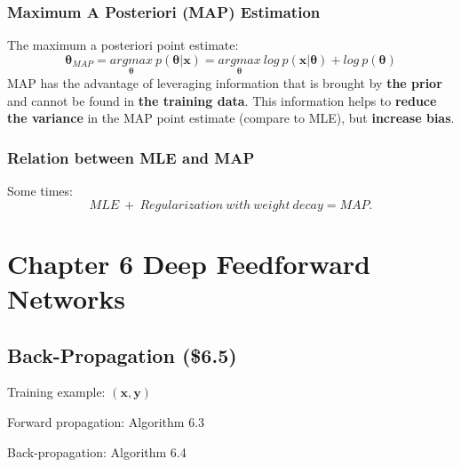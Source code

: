 \documentclass[12pt]{article}
\numberwithin{equation}{section}
\begin{document}
\subsubsection{Maximum A Posteriori (MAP) Estimation}
The maximum a posteriori point estimate:
\begin{equation}
	\boldsymbol\theta_{MAP}=\underset{\boldsymbol\theta}{argmax} \  p(\boldsymbol{\theta|x})=\underset{\boldsymbol\theta}{argmax} \ log \  p(\boldsymbol{x|\theta})+log\ p(\boldsymbol{\theta})
\end{equation}
MAP has the advantage of leveraging information that is brought by \textbf{the prior} and cannot be found in \textbf{the training data}. This information helps to \textbf{reduce the variance} in the MAP point estimate (compare to MLE), but \textbf{increase bias}. \par
\subsubsection{Relation between MLE and MAP}
Some times:
\begin{equation}
MLE \ + \ Regularization\ with\ weight\ decay = MAP .
\end{equation}
\section{Chapter 6 Deep Feedforward Networks}
\subsection{Back-Propagation (\$6.5)}
Training example: $(\mathbf{x}, \mathbf{y})$ \par
Forward propagation: Algorithm 6.3 \par
Back-propagation: Algorithm 6.4 \par
\end{document}
